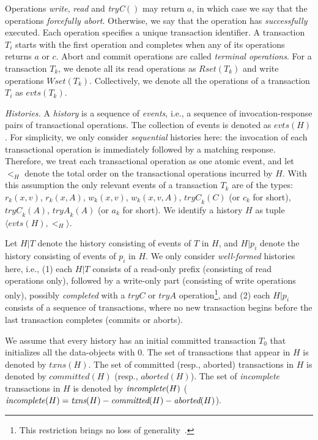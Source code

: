 \documentclass{llncs}
\newcommand{\id}[1]{\mbox{\textit{#1}}}\newcommand{\res}[1]{\mbox{\textbf{#1}}}
\newcommand{\op} {operation}
\newcommand{\termop} {terminal operation}
\newcommand{\comm}{\textit{committed}}
\newcommand{\aborted}{\textit{aborted}}
\newcommand{\txns}{\textit{txns}}
\newcommand{\evts}[1] {evts(#1)}
\newcommand{\tryc} {\textit{tryC}}
\newcommand{\trya}{\textit{tryA}}
\begin{document}
Operations \textit{write}, \textit{read} and \textit{\tryc}$()$ may
return $a$, in which case we say that the operations \emph{forcefully
abort}. Otherwise, we say that the operation has \emph{successfully}
executed.  Each operation specifies a unique transaction
identifier. A transaction $T_i$ starts with the first operation and
completes when any of its operations returns $a$ or $c$. 
Abort and commit \op{s} are called \emph{\termop{s}}. 
For a transaction $T_k$, we denote all its  read \op{s} as $Rset(T_k)$
and write \op{s} $Wset(T_k)$. Collectively, we denote all the \op{s}
of a  transaction $T_i$ as $\evts{T_k}$. 

\vspace{1mm}
\noindent
\textit{Histories.} 
A \emph{history} is a sequence of \emph{events}, i.e., a sequence of
invocation-response pairs of transactional operations. The collection
of events is denoted as $\evts{H}$. For simplicity, we only consider
\emph{sequential} histories here: the invocation of each transactional
operation is immediately followed by a matching response. Therefore,
we treat each transactional operation as one atomic event, and let
$<_H$ denote the total order on the transactional operations incurred
by $H$. With this assumption the only relevant events of a transaction
$T_k$ are of the types: $r_k(x,v)$, $r_k(x,A)$, $w_k(x, v)$, $w_k(x,
v,A)$, $\tryc_k(C)$ (or $c_k$ for short), $\tryc_k(A)$, $\trya_k(A)$ (or $a_k$ for short). 
We identify a history
$H$ as tuple $\langle \evts{H},<_H \rangle$. 


Let $H|T$ denote the history consisting of events of $T$ in $H$, 
and $H|p_i$ denote the history consisting of events of $p_i$ in $H$. 
We only consider \emph{well-formed} histories here, i.e.,
(1) each $H|T$ consists of  a read-only prefix (consisting of read
operations only), followed by a
write-only part (consisting of write operations only), possibly \emph{completed}
with a $\tryc$ or $\trya$ operation\footnote{This restriction brings no loss of 
generality~\cite{KR:2011:OPODIS}.},  and
(2) each $H|p_i$ consists of a sequence of transactions, where no new
transaction begins before the last transaction
completes (commits or aborts). 

We assume that every history has an initial committed transaction $T_0$
that initializes all the data-objects with 0. The set of transactions
that appear in $H$ is denoted by $\txns(H)$. The set of committed
(resp., aborted) transactions in $H$ is denoted by $\comm(H)$
(resp., $\aborted(H)$). The set of \emph{incomplete} transactions
in $H$ is denoted by $\id{incomplete}(H)$
($\id{incomplete}(H)=\txns(H)-\comm(H)-\aborted(H)$). 
\end{document}

